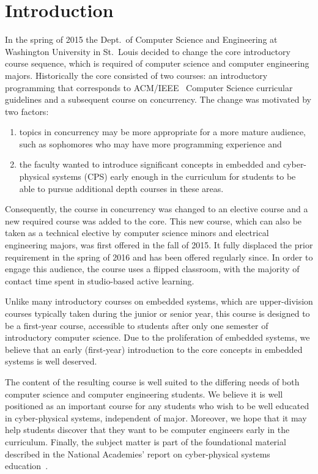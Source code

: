 \section{Introduction}
\label{sec:intro}

In the spring of 2015 the Dept.~of Computer Science and Engineering at Washington University in St.~Louis decided to change the core introductory course sequence, which is required of computer science and computer engineering majors.  Historically the core  consisted of two courses: an introductory programming that corresponds to ACM/IEEE~\cite{cs13} Computer Science curricular guidelines and a subsequent course on concurrency.  The change was motivated by two factors:
\begin{enumerate}
  \item topics in concurrency may be more appropriate for a more mature audience, such as sophomores who may have more programming experience and
  \item the faculty wanted to introduce significant concepts in embedded and cyber-physical systems (CPS) early enough in the curriculum for students to be able to pursue additional depth courses in these areas.
\end{enumerate}

Consequently, the course in concurrency was changed to an elective course and a new required course was added to the core.  This new course, which can also be taken as a technical elective by computer science minors and electrical engineering majors, was first offered in the fall of 2015.  It fully displaced the prior requirement in the spring of 2016 and has been offered regularly since.  In order to engage this audience, the course uses a flipped classroom, with the majority of contact time spent in studio-based active learning.

Unlike many introductory courses on embedded systems, which are upper-division courses typically taken during the junior or senior year, this course is designed to be a first-year course, accessible to students after only one semester of introductory computer science.  Due to the proliferation of embedded systems, we believe that an early (first-year) introduction to the core concepts in embedded systems is well deserved.

The content of the resulting course is well suited to the differing needs of both computer science and computer engineering students.  We believe it is well positioned as an important course for any students who wish to be well educated in cyber-physical systems, independent of major. Moreover, we hope that it may help students discover that they want to be computer engineers early in the curriculum. Finally, the subject matter is part of the foundational material described in the National Academies' report on cyber-physical systems education~\cite{nasem16}.

